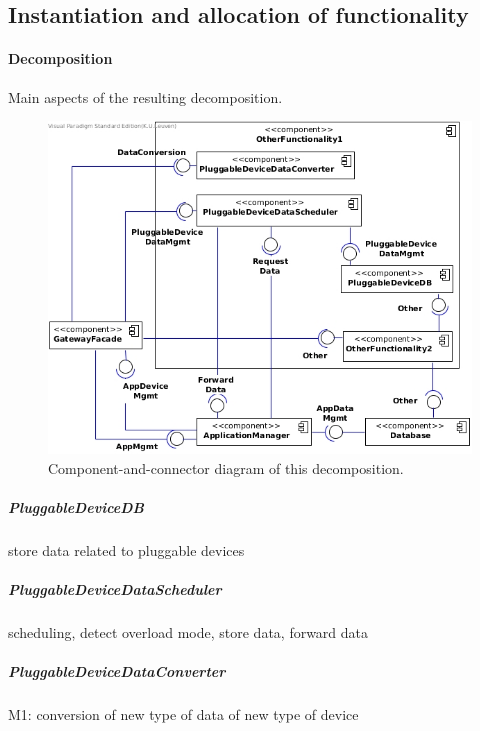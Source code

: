 \subsection{Instantiation and allocation of functionality}
    \paragraph{Decomposition}
        Main aspects of the resulting decomposition.

        \begin{figure}[!htp]
        	\centering
            \includegraphics[width=1.00\textwidth]{component-diagram-2}
        	\caption{Component-and-connector diagram of this decomposition.}
            \label{fig:it1-cc_main}
        \end{figure}

    \subparagraph{PluggableDeviceDB}
        store data related to pluggable devices

    \subparagraph{PluggableDeviceDataScheduler}
        scheduling, detect overload mode, store data, forward data

    \subparagraph{PluggableDeviceDataConverter}
        M1: conversion of new type of data of new type of device


